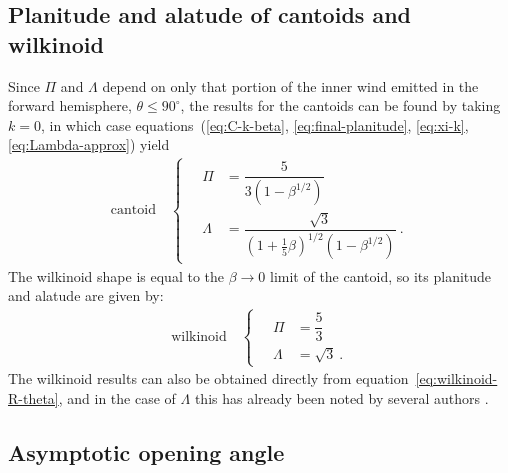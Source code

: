 \subsection{Planitude and alatude of cantoids and wilkinoid}
\label{sec:cantoid-wilkinoid-shapes}

Since \(\Pi\) and \(\Lambda\) depend on only that portion of the inner wind
emitted in the forward hemisphere, \(\theta \le 90^\circ\), the results for the
cantoids can be found by taking \(k = 0\), in which case
equations~(\ref{eq:C-k-beta}, \ref{eq:final-planitude}, \ref{eq:xi-k},
\ref{eq:Lambda-approx}) yield
\begin{gather}
  \label{eq:cantoid-Pi-Lambda}
  \text{cantoid} \quad
  \begin{cases}
    \quad \Pi &= \dfrac {5} {3 \left( 1 - \beta^{1/2} \right)}\\[12pt]
    \quad \Lambda &= \dfrac { \sqrt 3} {\left( 1 + \tfrac15 \beta \right)^{1/2} \left( 1 - \beta^{1/2} \right)} \ .
  \end{cases}
\end{gather}
The wilkinoid shape is equal to the \(\beta \to 0\) limit of the cantoid, so
its planitude and alatude are given by:
\begin{gather}
  \label{eq:wilkinoid-Pi-Lambda}
  \text{wilkinoid} \quad
  \begin{cases}
    \quad \Pi &= \dfrac {5} {3}\\[10pt]
    \quad \Lambda &= \sqrt 3 \ .
  \end{cases}
\end{gather}
The wilkinoid results can also be obtained directly from
equation~\eqref{eq:wilkinoid-R-theta}, and in the case of \(\Lambda\) this
has already been noted by several authors \citep{Cox:2012a,
  Meyer:2016a}.

\subsection{Asymptotic opening angle}
\label{sec:asympt-open-angle}

